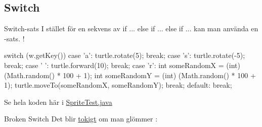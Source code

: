 \documentclass{lecturenotes}
\begin{document}

\subsection{Switch}
\begin{Slide}{Switch-sats}
I stället för en sekvens av if ... else if ... else if ... kan man använda en -sats.  !
\begin{Code}[basicstyle=\ttfamily\fontsize{7}{8}\selectfont]
    switch (w.getKey()) {
    case 'a':
        turtle.rotate(5);
        break;
    case 's':
        turtle.rotate(-5);
        break;
    case ' ':
        turtle.forward(10);
        break;
    case 'r':
        int someRandomX = (int) (Math.random() * 100 + 1);
        int someRandomY = (int) (Math.random() * 100 + 1);
        turtle.moveTo(someRandomX, someRandomY);
        break;
    default:
        break;
    }
\end{Code}
Se hela koden här i \href{https://github.com/bjornregnell/lth-eda016-2015/blob/master/lectures/examples/eclipse-ws/cs_pt/src/se/lth/cs/pt/window/SpriteTest.java}{SpriteTest.java}
\end{Slide} 
            
\begin{Slide}{Broken Switch}
Det blir \href{https://github.com/bjornregnell/lth-eda016-2015/blob/master/lectures/examples/eclipse-ws/lecture-examples/src/week05/BrokenSwitch.java}{tokigt} om man glömmer :

\end{Slide}            
\end{document}
